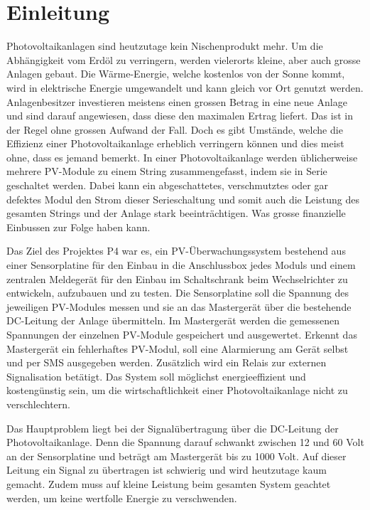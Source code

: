 \chapter{Einleitung}
\label{chap:einleitung}

Photovoltaikanlagen   sind  heutzutage   kein   Nischenprodukt  mehr. Um   die
Abhängigkeit  vom Erdöl  zu verringern,  werden vielerorts  kleine, aber  auch
grosse  Anlagen gebaut. Die  W\"arme-Energie, welche  kostenlos von  der Sonne
kommt,  wird  in elektrische  Energie  umgewandelt  und  kann gleich  vor  Ort
genutzt werden. Anlagenbesitzer  investieren meistens einen grossen  Betrag in
eine  neue  Anlage  und  sind  darauf angewiesen,  dass  diese  den  maximalen
Ertrag  liefert. Das ist  in der  Regel  ohne grossen  Aufwand der  Fall. Doch
es  gibt Umstände,  welche  die Effizienz  einer Photovoltaikanlage  erheblich
verringern  können und  dies meist  ohne, dass  es jemand  bemerkt.  In  einer
Photovoltaikanlage  werden üblicherweise  mehrere  PV-Module  zu einem  String
zusammengefasst,  indem  sie  in   Serie  geschaltet  werden. Dabei  kann  ein
abgeschattetes,  verschmutztes  oder  gar  defektes  Modul  den  Strom  dieser
Serieschaltung und somit auch die Leistung des gesamten Strings und der Anlage
stark beeinträchtigen. Was grosse finanzielle Einbussen zur Folge haben kann.

Das  Ziel des  Projektes P4  war es,  ein PV-Überwachungssystem  bestehend aus
einer Sensorplatine für den Einbau in  die Anschlussbox jedes Moduls und einem
zentralen Meldegerät  für den Einbau  im Schaltschrank beim  Wechselrichter zu
entwickeln, aufzubauen und zu testen. Die  Sensorplatine soll die Spannung des
jeweiligen PV-Modules  messen und sie  an das Mastergerät über  die bestehende
DC-Leitung  der  Anlage  übermitteln. Im  Mastergerät  werden  die  gemessenen
Spannungen der  einzelnen PV-Module  gespeichert und  ausgewertet. Erkennt das
Mastergerät ein fehlerhaftes  PV-Modul, soll eine Alarmierung  am Gerät selbst
und  per  SMS  ausgegeben  werden. Zusätzlich wird  ein  Relais  zur  externen
Signalisation  betätigt.   Das  System  soll  möglichst  energieeffizient  und
kostengünstig sein,  um die wirtschaftlichkeit einer  Photovoltaikanlage nicht
zu verschlechtern.

Das  Hauptproblem liegt  bei  der Signalübertragung  über  die DC-Leitung  der
Photovoltaikanlage. Denn die Spannung darauf schwankt  zwischen 12 und 60 Volt
an der Sensorplatine  und beträgt am Mastergerät bis zu  1000 Volt. Auf dieser
Leitung  ein Signal  zu  übertragen  ist schwierig  und  wird heutzutage  kaum
gemacht.  Zudem muss auf kleine Leistung beim gesamten System geachtet werden,
um keine wertfolle Energie zu verschwenden.


